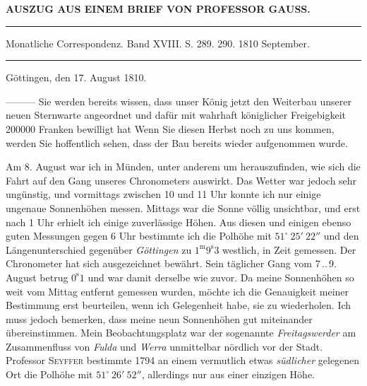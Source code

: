\clearpage{}\hypertarget{native-323-lower}{}\label{native-323-lower}

\begin{center}\textbf{AUSZUG AUS EINEM BRIEF VON PROFESSOR GAUSS.}\par\vspace{4pt}\hrule\vspace{4pt}\fontsize{10}{12}\selectfont Monatliche Correspondenz. Band XVIII. S. 289. 290. 1810 September.\par\vspace{4pt}\hrule\vspace{4pt}\end{center}
\begin{flushright}Göttingen, den 17. August 1810.\end{flushright}

\par\indent ---\enspace---\enspace--- Sie werden bereits wissen, dass unser König jetzt den Weiterbau unserer neuen Sternwarte angeordnet und dafür mit wahrhaft königlicher Freigebigkeit 200000 Franken bewilligt hat
Wenn Sie diesen Herbst noch zu uns kommen, werden Sie hoffentlich sehen, dass der Bau bereits wieder aufgenommen wurde.

Am 8. August war ich in Münden, unter anderem um herauszufinden, wie sich die Fahrt auf den Gang unseres Chronometers auswirkt. Das Wetter war jedoch sehr ungünstig, und vormittags zwischen 10 und 11 Uhr konnte ich nur einige ungenaue Sonnenhöhen messen. Mittags war die Sonne völlig unsichtbar, und erst nach 1 Uhr erhielt ich einige zuverlässige Höhen. Aus diesen und einigen ebenso guten Messungen gegen 6 Uhr bestimmte ich die Polhöhe mit $51^\circ\ 25'\ 22''$ und den Längenunterschied gegenüber \emph{Göttingen} zu $1^{\text{m}}9^{\text{s}}3$ westlich, in Zeit gemessen. Der Chronometer hat sich ausgezeichnet bewährt. Sein täglicher Gang vom 7\,..\,9. August betrug $0^{\text{s}}1$ und war damit derselbe wie zuvor. Da meine Sonnenhöhen so weit vom Mittag entfernt gemessen wurden, möchte ich die Genauigkeit meiner Bestimmung erst beurteilen, wenn ich Gelegenheit habe, sie zu wiederholen. Ich muss jedoch bemerken, dass meine neun Sonnenhöhen gut miteinander übereinstimmen. Mein Beobachtungsplatz war der sogenannte \emph{Freitagswerder} am Zusammenfluss von \emph{Fulda} und \emph{Werra} unmittelbar nördlich vor der Stadt. Professor \textsc{Seyffer} bestimmte 1794 an einem vermutlich etwas \emph{südlicher} gelegenen Ort die Polhöhe mit $51^\circ\ 26'\ 52''$, allerdings nur aus einer einzigen Höhe.
